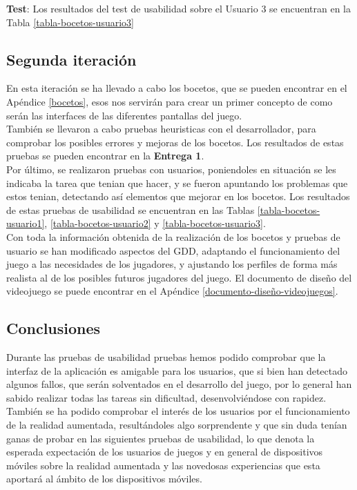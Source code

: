 \begin{itemize}
  \textbf{Test}: Los resultados del test de usabilidad sobre el Usuario 3 se encuentran en la Tabla \ref{tabla-bocetos-usuario3}

\subsection{Segunda iteración}
En esta iteración se ha llevado a cabo los bocetos, que se pueden encontrar en el Apéndice \ref{bocetos}, esos nos servirán para crear un primer concepto de como serán las interfaces de las diferentes pantallas del juego.\\

También se llevaron a cabo pruebas heuristicas con el desarrollador, para comprobar los posibles errores y mejoras de los bocetos. Los resultados de estas pruebas se pueden encontrar en la \textbf{Entrega 1}.\\

Por último, se realizaron pruebas con usuarios, poniendoles en situación se les indicaba la tarea que tenian que hacer, y se fueron apuntando los problemas que estos tenian, detectando así elementos que mejorar en los bocetos. Los resultados de estas pruebas de usabilidad se encuentran en las Tablas \ref{tabla-bocetos-usuario1}, \ref{tabla-bocetos-usuario2} y \ref{tabla-bocetos-usuario3}.\\

Con toda la información obtenida de la realización de los bocetos y pruebas de usuario se han modificado aspectos del GDD, adaptando el funcionamiento del juego a las necesidades de los jugadores, y ajustando los perfiles de forma más realista al de los posibles futuros jugadores del juego. El documento de diseño del videojuego se puede encontrar en el Apéndice \ref{documento-diseño-videojuegos}.

\subsection{Conclusiones}
Durante las pruebas de usabilidad pruebas hemos podido comprobar que la interfaz de la aplicación es amigable para los usuarios, que si bien han detectado algunos fallos, que serán solventados en el desarrollo del juego, por lo general han sabido realizar todas las tareas sin dificultad, desenvolviéndose con rapidez.\\

También se ha podido comprobar el interés de los usuarios por el funcionamiento de la realidad aumentada, resultándoles algo sorprendente y que sin duda tenían ganas de probar en las siguientes pruebas de usabilidad, lo que denota la esperada expectación de los usuarios de juegos y en general de dispositivos móviles sobre la realidad aumentada y las novedosas experiencias que esta aportará al ámbito de los dispositivos móviles.


\end{itemize}
